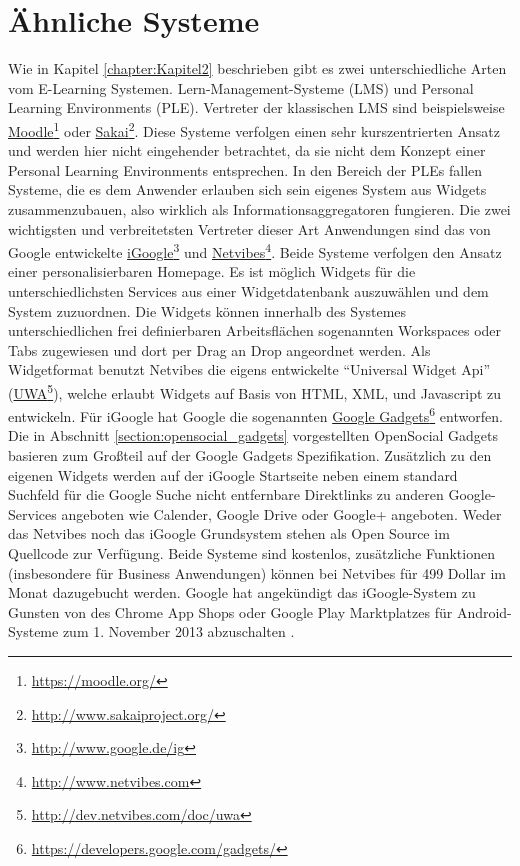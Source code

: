 \section{Ähnliche Systeme}\label{section:aehnliche_systeme}
Wie in Kapitel \ref{chapter:Kapitel2} beschrieben gibt es zwei unterschiedliche Arten vom E-Learning Systemen. Lern-Management-Systeme (LMS) und Personal Learning Environments (PLE). Vertreter der klassischen LMS sind beispielsweise \href{https://moodle.org/}{Moodle}\footnote{\url{https://moodle.org/}} oder \href{http://www.sakaiproject.org/}{Sakai}\footnote{\url{http://www.sakaiproject.org/}}. Diese Systeme verfolgen einen sehr kurszentrierten Ansatz und werden hier nicht eingehender betrachtet, da sie nicht dem Konzept einer Personal Learning Environments entsprechen. In den Bereich der PLEs fallen Systeme, die es dem Anwender erlauben sich sein eigenes System aus Widgets zusammenzubauen, also wirklich als Informationsaggregatoren fungieren. Die zwei wichtigsten und verbreitetsten Vertreter dieser Art Anwendungen sind das von Google entwickelte \href{http://www.google.de/ig}{iGoogle}\footnote{\url{http://www.google.de/ig}} und \href{http://www.netvibes.com}{Netvibes}\footnote{\url{http://www.netvibes.com}}. Beide Systeme verfolgen den Ansatz einer personalisierbaren Homepage. Es ist möglich Widgets für die unterschiedlichsten Services aus einer Widgetdatenbank auszuwählen und dem System zuzuordnen. Die Widgets können innerhalb des Systemes unterschiedlichen frei definierbaren Arbeitsflächen sogenannten Workspaces oder Tabs zugewiesen und dort per Drag an Drop angeordnet werden. Als Widgetformat benutzt Netvibes die eigens entwickelte "`Universal Widget Api"' (\href{http://dev.netvibes.com/doc/uwa}{UWA}\footnote{\url{http://dev.netvibes.com/doc/uwa}}), welche erlaubt Widgets auf Basis von HTML, XML, und Javascript zu entwickeln. Für iGoogle hat Google die sogenannten \href{https://developers.google.com/gadgets/}{Google Gadgets}\footnote{\url{https://developers.google.com/gadgets/}} entworfen. Die in Abschnitt \ref{section:opensocial_gadgets} vorgestellten OpenSocial Gadgets basieren zum Großteil auf der Google Gadgets Spezifikation. Zusätzlich zu den eigenen Widgets werden auf der iGoogle Startseite neben einem standard Suchfeld für die Google Suche nicht entfernbare Direktlinks zu anderen Google-Services angeboten wie Calender, Google Drive oder Google+ angeboten. Weder das Netvibes noch das iGoogle Grundsystem stehen als Open Source im Quellcode zur Verfügung. Beide Systeme sind kostenlos, zusätzliche Funktionen (insbesondere für Business Anwendungen) können bei Netvibes für 499 Dollar im Monat dazugebucht werden. Google hat angekündigt das iGoogle-System zu Gunsten von des Chrome App Shops oder Google Play Marktplatzes für Android-Systeme zum 1. November 2013 abzuschalten \cite{igoogle_future}.

